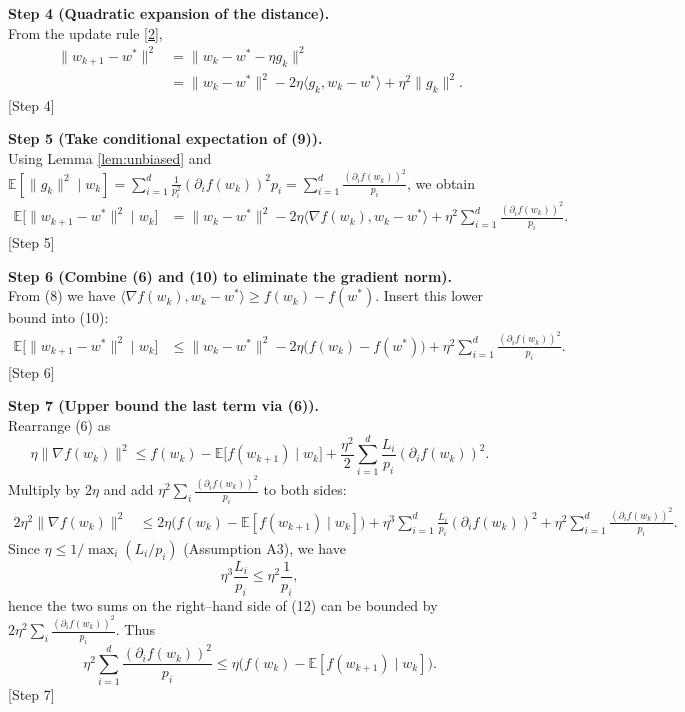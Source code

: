 \documentclass[11pt]{article}
\newcommand{\EE}{\mathbb{E}}
\begin{document}
\noindent\textbf{Step 4 (Quadratic expansion of the distance).}\\
From the update rule \eqref{2},
\begin{align}
\|w_{k+1}-w^{*}\|^{2}
&= \|w_k-w^{*}-\eta g_k\|^{2} \nonumber\\
&= \|w_k-w^{*}\|^{2}
   -2\eta\langle g_k,w_k-w^{*}\rangle
   +\eta^{2}\|g_k\|^{2}.
\tag{9}
\end{align}
\hfill[Step 4]

\noindent\textbf{Step 5 (Take conditional expectation of (9)).}\\
Using Lemma \ref{lem:unbiased} and $\EE[\|g_k\|^{2}\mid w_k]
      =\sum_{i=1}^{d}\frac{1}{p_i^{2}}(\partial_i f(w_k))^{2}p_i
      =\sum_{i=1}^{d}\frac{(\partial_i f(w_k))^{2}}{p_i}$, we obtain
\begin{align}
\EE\!\big[\|w_{k+1}-w^{*}\|^{2}\mid w_k\big]
&= \|w_k-w^{*}\|^{2}
   -2\eta\langle\nabla f(w_k),w_k-w^{*}\rangle
   +\eta^{2}\sum_{i=1}^{d}\frac{(\partial_i f(w_k))^{2}}{p_i}.
\tag{10}
\end{align}
\hfill[Step 5]

\noindent\textbf{Step 6 (Combine (6) and (10) to eliminate the gradient norm).}\\
From (8) we have $\langle\nabla f(w_k),w_k-w^{*}\rangle\ge f(w_k)-f(w^{*})$.
Insert this lower bound into (10):
\begin{align}
\EE\!\big[\|w_{k+1}-w^{*}\|^{2}\mid w_k\big]
&\le \|w_k-w^{*}\|^{2}
   -2\eta\big(f(w_k)-f(w^{*})\big)
   +\eta^{2}\sum_{i=1}^{d}\frac{(\partial_i f(w_k))^{2}}{p_i}.
\tag{11}
\end{align}
\hfill[Step 6]

\noindent\textbf{Step 7 (Upper bound the last term via (6)).}\\
Rearrange (6) as
\[
\eta\|\nabla f(w_k)\|^{2}
\le f(w_k)-\EE\!\big[f(w_{k+1})\mid w_k\big]
   +\frac{\eta^{2}}{2}\sum_{i=1}^{d}\frac{L_i}{p_i}(\partial_i f(w_k))^{2}.
\]
Multiply by $2\eta$ and add $\eta^{2}\sum_{i}\frac{(\partial_i f(w_k))^{2}}{p_i}$ to both sides:
\begin{align}
2\eta^{2}\|\nabla f(w_k)\|^{2}
&\le 2\eta\big(f(w_k)-\EE[f(w_{k+1})\mid w_k]\big)
   +\eta^{3}\sum_{i=1}^{d}\frac{L_i}{p_i}(\partial_i f(w_k))^{2}
   +\eta^{2}\sum_{i=1}^{d}\frac{(\partial_i f(w_k))^{2}}{p_i}.
\tag{12}
\end{align}
Since $\eta\le 1/\max_i(L_i/p_i)$ (Assumption A3), we have
\[
\eta^{3}\frac{L_i}{p_i}\le\eta^{2}\frac{1}{p_i},
\]
hence the two sums on the right–hand side of (12) can be bounded by
$2\eta^{2}\sum_{i}\frac{(\partial_i f(w_k))^{2}}{p_i}$.
Thus
\[
\eta^{2}\sum_{i=1}^{d}\frac{(\partial_i f(w_k))^{2}}{p_i}
\le \eta\big(f(w_k)-\EE[f(w_{k+1})\mid w_k]\big).
\tag{13}
\]
\hfill[Step 7]
\end{document}
